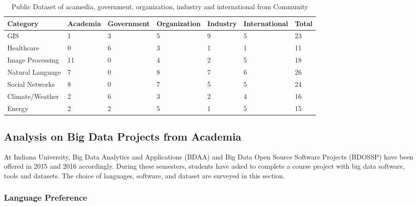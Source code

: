 \documentclass[9pt,twocolumn,twoside]{styles/osajnl}
\begin{document}
\begin{table}[htb]
  \begin{center}
    \begin{small}
      \begin{tabular}{l|l|l|l|l|l|l}

    Category         & Academia & Government & Organization & Industry & International & Total \\ \hline \hline
    GIS              & 1        & 3          & 5            & 9        & 5             & 23    \\ \hline
    Healthcare       & 0        & 6          & 3            & 1        & 1             & 11    \\ \hline
    Image Processing & 11       & 0          & 4            & 2        & 5             & 18    \\ \hline
    Natural Language & 7        & 0          & 8            & 7        & 6             & 26    \\ \hline
    Social Networks  & 8        & 0          & 7            & 5        & 5             & 24    \\ \hline
    Climate/Weather  & 2        & 6          & 3            & 2        & 4             & 16    \\ \hline
    Energy           & 2        & 2          & 5            & 1        & 5             & 15    \\ 

      \end{tabular}
      \caption{Public Dataset of acamedia, government, organization,
        industry and international from Community}
      \label{tab:dataset-sector}
    \end{small}
  \end{center}
\end{table}


\subsection{Analysis on Big Data Projects from Academia}

At Indiana University, Big Data Analytics and Applications (BDAA) and
Big Data Open Source Software Projects (BDOSSP) have been offered in
2015 and 2016 accordingly. During these semesters, students have asked
to complete a course project with big data software, tools and
datasets. The choice of languages, software, and dataset are
surveyed in this section.

\subsubsection{Language Preference}
\end{document}
